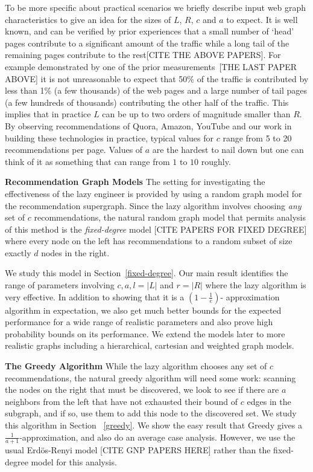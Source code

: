 To be more specific about practical scenarios we briefly describe
input web graph characteristics to give an idea for the sizes of $L$,
$R$, $c$ and $a$ to expect. It is well known, and can be verified by
prior experiences that a small number of `head' pages contribute to a
significant amount of the traffic while a long tail of the remaining
pages contribute to the rest[CITE THE ABOVE PAPERS]. For example
demonstrated by one of the prior measurements~\cite{}[THE LAST PAPER
  ABOVE] it is not unreasonable to expect that 50\% of the traffic is
contributed by less than 1\% (a few thousands) of the web pages and a
large number of tail pages (a few hundreds of thousands) contributing
the other half of the traffic. This implies that in practice $L$ can
be up to two orders of magnitude smaller than $R$.  By observing
recommendations of Quora, Amazon, YouTube and our work in building
these technologies in practice, typical values for $c$ range from 5 to
20 recommendations per page. Values of $a$ are the hardest to nail
down but one can think of it as something that can range from $1$ to
$10$ roughly.

{\bf Recommendation Graph Models} The setting for investigating the
effectiveness of the lazy engineer is provided by using a random graph
model for the recommendation supergraph. Since the lazy algorithm
involves choosing {\em any} set of $c$ recommendations, the natural
random graph model that permits analysis of this method is the {\em
  fixed-degree} model [CITE PAPERS FOR FIXED DEGREE] where every node
on the left has recommendations to a random subset of size exactly $d$
nodes in the right.

We study this model in Section~\ref{fixed-degree}. Our main result
identifies the range of parameters involving $c,a,l=|L|$ and $r =|R|$
where the lazy algorithm is very effective. In addition to showing
that it is a $(1-\frac1e)$- approximation algorithm in expectation, we
also get much better bounds for the expected performance for a wide
range of realistic parameters and also prove high probability bounds
on its performance. We extend the models later to more realistic
graphs including a hierarchical, cartesian and weighted graph
models. \vs

{\bf The Greedy Algorithm}
While the lazy algorithm chooses any set of $c$ recommendations, the natural
greedy algorithm will need some work: scanning the nodes on the right that must
be discovered, we look to see if there are $a$ neighbors from the left that have
not exhausted their bound of $c$ edges in the subgraph, and if so, use them to
add this node to the discovered set. We study this algorithm in Section
~\ref{greedy}. We show the easy result that Greedy gives a 
$\frac{1}{a+1}$-approximation, and also do an average case analysis. However, we
use the usual Erd\"os-Renyi model [CITE GNP PAPERS HERE] rather than the fixed-degree model for this
analysis.

